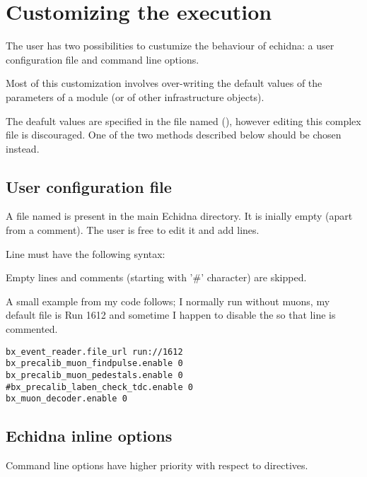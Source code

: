 \section{Customizing the execution}
\label{sec:custom}

The user has two possibilities to custumize the behaviour of echidna: a user configuration file and command line options.

Most of this customization involves over-writing the default values of the parameters of a module (or of other infrastructure objects).

The deafult values  are specified in the file named  (), however editing this complex file is discouraged.
One of the two methods described below should be chosen instead.


\subsection{User configuration file}
\label{sec:custom_user_cfg}

A file named  is present in the main Echidna directory.
It is inially empty (apart from a comment).
The user is free to edit it and add lines.

Line must have the following syntax:

Empty lines and comments (starting with '\#' character) are skipped.

A small example from my code follows; I normally run without muons, my default file is Run 1612 
and sometime I happen to disable the  so that line is commented.
\begin{verbatim}
bx_event_reader.file_url run://1612
bx_precalib_muon_findpulse.enable 0
bx_precalib_muon_pedestals.enable 0
#bx_precalib_laben_check_tdc.enable 0
bx_muon_decoder.enable 0
\end{verbatim}


\subsection{Echidna inline options}
\label{sec:custom_options}

Command line options have higher priority with respect to  directives. 

